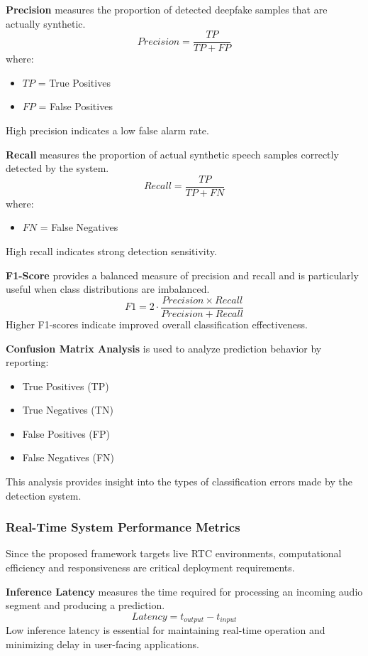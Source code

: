 \textbf{Precision} measures the proportion of detected deepfake samples that are actually synthetic.
\begin{equation}
Precision =
\frac{TP}{TP + FP}
\end{equation}
where:
\begin{itemize}
\item $TP$ = True Positives
\item $FP$ = False Positives
\end{itemize}
High precision indicates a low false alarm rate.

\textbf{Recall} measures the proportion of actual synthetic speech samples correctly detected by the system.
\begin{equation}
Recall =
\frac{TP}{TP + FN}
\end{equation}
where:
\begin{itemize}
\item $FN$ = False Negatives
\end{itemize}
High recall indicates strong detection sensitivity.

\textbf{F1-Score} provides a balanced measure of precision and recall and is particularly useful when class distributions are imbalanced.
\begin{equation}
F1 =
2 \cdot
\frac{Precision \times Recall}
{Precision + Recall}
\end{equation}
Higher F1-scores indicate improved overall classification effectiveness.

\textbf{Confusion Matrix Analysis} is used to analyze prediction behavior by reporting:
\begin{itemize}
\item True Positives (TP)
\item True Negatives (TN)
\item False Positives (FP)
\item False Negatives (FN)
\end{itemize}
This analysis provides insight into the types of classification errors made by the detection system.

\subsubsection{Real-Time System Performance Metrics}

Since the proposed framework targets live RTC environments, computational efficiency and responsiveness are critical deployment requirements.

\textbf{Inference Latency} measures the time required for processing an incoming audio segment and producing a prediction.
\begin{equation}
Latency =
t_{output} - t_{input}
\end{equation}
Low inference latency is essential for maintaining real-time operation and minimizing delay in user-facing applications.

